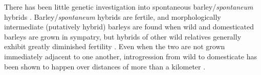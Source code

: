 \documentclass[11pt]{article}
\begin{document}
\begin{enumerate}


There has been little genetic investigation into spontaneous barley/\emph{spontaneum} hybrids \cite{ellstrand2003dangerous}.
Barley/\emph{spontaneum} hybrids are fertile, and morphologically intermediate (putatively hybrid) barleys are found when wild and domesticated barleys are grown in sympatry, but hybrids of other wild relatives generally exhibit greatly diminished fertility \cite{ellstrand2003dangerous, harlan1995living}.
Even when the two are not grown immediately adjacent to one another, introgression from wild to domesticate has been shown to happen over distances of more than a kilometer \cite{hillman2001new}.



\end{enumerate}
\end{document}
